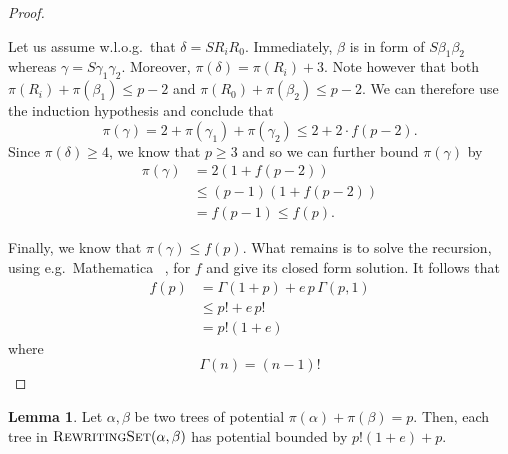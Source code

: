 \documentclass[11pt,a4paper]{amsart}
\theoremstyle{definition}
\newtheorem{lemma}[theorem]{Lemma}
\newcommand{\RewritingSet}[2]{\textsc{RewritingSet}(#1,#2)}
\newcommand{\potential}[1]{\pi(#1)}
\newcommand{\gammaF}[1]{\Gamma(#1,1)}
\begin{document}
\begin{proof}
\begin{enumerate}[(i)]
                 Let us assume w.l.o.g.~that $\delta = S R_i R_0$. Immediately,
                 $\beta$ is in form of $S \beta_1 \beta_2$ whereas $\gamma = S \gamma_1 	
                 \gamma_2$. Moreover, $\potential{\delta} = \potential{R_i} + 3$. Note 
                 however that both $\potential{R_i} + \potential{\beta_1} \leq p - 2$
                 and $\potential{R_0} + \potential{\beta_2} \leq p - 2$. We can
                  therefore use the induction hypothesis and conclude that
                  \[\potential{\gamma} = 2 + \potential{\gamma_1} + \potential{\gamma_2}
                  \leq 2 + 2 \cdot f(p-2).\]
				Since $\potential{\delta} \geq 4$, we know that $p \geq 3$ and so we can further bound $\potential{\gamma}$ by
				\begin{eqnarray*}
				\potential{\gamma} &= 2 \left(1 + f(p-2)\right)\\
				&\leq (p-1) \left( 1 + f(p-2) \right)\\
				&=f(p-1) \leq f(p).
				\end{eqnarray*}
    \end{enumerate}
    Finally, we know that $\potential{\gamma} \leq f(p)$. What remains is to solve
    the recursion, using e.g.~Mathematica \textregistered~\cite{mathematicaSoft}, for $f$ and give its closed form solution. It follows that
    \begin{eqnarray*}
        f(p) &= \Gamma (1 + p) + e\, p\, \gammaF{p}\\
             &\leq p! + e\, p!\\
             &= p! (1 + e)
    \end{eqnarray*}
    where \[ \Gamma(n) = (n - 1)! \]
\end{proof}

\begin{lemma}\label{lem-rewritingset-potential-upperbound}
    Let $\alpha,\beta$ be two trees of potential
    $\potential{\alpha} + \potential{\beta} = p$. Then, each tree in
    $\RewritingSet{\alpha}{\beta}$ has potential bounded by $p! (1 + e) + p$.
\end{lemma}
\end{document}
